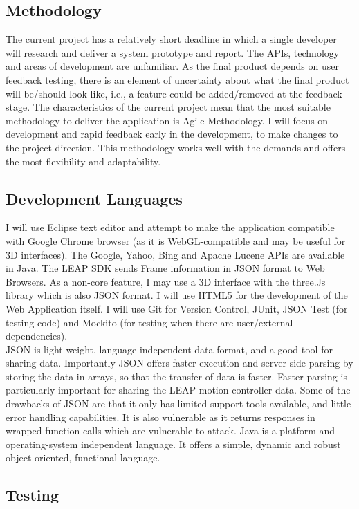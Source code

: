 \documentclass[10pt]{article}
\begin{document}
\subsection{Methodology}
The current project has a relatively short deadline in which a single developer will research and deliver a system prototype and report. The APIs, technology and areas of development are unfamiliar. As the final product depends on user feedback testing, there is an element of uncertainty about what the final product will be/should look like, i.e., a feature could be added/removed at the feedback stage. The characteristics of the current project mean that the most suitable methodology to deliver the application is Agile Methodology. I will focus on development and rapid feedback early in the development, to make changes to the project direction. This methodology works well with the demands and offers the most flexibility and adaptability.


\subsection{Development Languages}
I will use Eclipse text editor and attempt to make the application compatible with Google Chrome browser (as it is WebGL-compatible and may be useful for 3D interfaces). The Google, Yahoo, Bing and Apache Lucene APIs are available in Java. The LEAP SDK sends Frame information in JSON format to Web Browsers. As a non-core feature, I may use a 3D interface with the three.Js library which is also JSON format. I will use HTML5 for the development of the Web Application itself. I will use Git for Version Control, JUnit, JSON Test (for testing code) and Mockito (for testing when there are user/external dependencies). \\
JSON is light weight, language-independent data format, and a good tool for sharing data. Importantly JSON offers faster execution and server-side parsing by storing the data in arrays, so that the transfer of data is faster. Faster parsing is particularly important for sharing the LEAP motion controller data. Some of the drawbacks of JSON are that it only has limited support tools available, and little error handling capabilities. It is also vulnerable as it returns responses in wrapped function calls which are vulnerable to attack. Java is a platform and operating-system independent language. It offers a simple, dynamic and robust object oriented, functional language.

\subsection{Testing}
\end{document}
